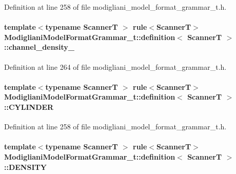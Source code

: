 Definition at line 258 of file modigliani\_\-model\_\-format\_\-grammar\_\-t.h.

\paragraph[{channel\_\-density\_\-}]{\setlength{\rightskip}{0pt plus 5cm}template$<$typename ScannerT $>$ rule$<$ScannerT$>$ {\bf ModiglianiModelFormatGrammar\_\-t::definition}$<$ ScannerT $>$::{\bf channel\_\-density\_\-}}\hfill\label{struct_modigliani_model_format_grammar__t_1_1definition_af213752dbd799ce5d3b9826e67a87eb7}


Definition at line 264 of file modigliani\_\-model\_\-format\_\-grammar\_\-t.h.

\paragraph[{CYLINDER}]{\setlength{\rightskip}{0pt plus 5cm}template$<$typename ScannerT $>$ rule$<$ScannerT$>$ {\bf ModiglianiModelFormatGrammar\_\-t::definition}$<$ ScannerT $>$::{\bf CYLINDER}}\hfill\label{struct_modigliani_model_format_grammar__t_1_1definition_aae4797f15e74405cf710628cd5e888e8}


Definition at line 258 of file modigliani\_\-model\_\-format\_\-grammar\_\-t.h.

\paragraph[{DENSITY}]{\setlength{\rightskip}{0pt plus 5cm}template$<$typename ScannerT $>$ rule$<$ScannerT$>$ {\bf ModiglianiModelFormatGrammar\_\-t::definition}$<$ ScannerT $>$::{\bf DENSITY}}\hfill\label{struct_modigliani_model_format_grammar__t_1_1definition_ad1d23859de9c664ec76c4b77771383fb}


